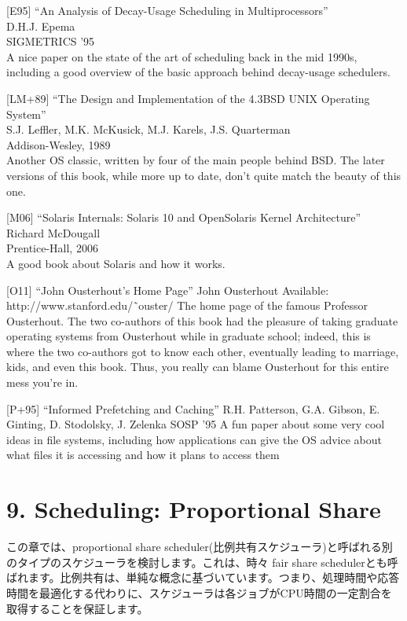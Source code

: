 {[}E95{]} ``An Analysis of Decay-Usage Scheduling in Multiprocessors''\\
D.H.J. Epema\\
SIGMETRICS '95\\
A nice paper on the state of the art of scheduling back in the mid
1990s, including a good overview of the basic approach behind
decay-usage schedulers.

{[}LM+89{]} ``The Design and Implementation of the 4.3BSD UNIX Operating
System''\\
S.J. Leffler, M.K. McKusick, M.J. Karels, J.S. Quarterman\\
Addison-Wesley, 1989\\
Another OS classic, written by four of the main people behind BSD. The
later versions of this book, while more up to date, don't quite match
the beauty of this one.

{[}M06{]} ``Solaris Internals: Solaris 10 and OpenSolaris Kernel
Architecture''\\
Richard McDougall\\
Prentice-Hall, 2006\\
A good book about Solaris and how it works.

{[}O11{]} ``John Ousterhout's Home Page'' John Ousterhout Available:
http://www.stanford.edu/˜ouster/ The home page of the famous Professor
Ousterhout. The two co-authors of this book had the pleasure of taking
graduate operating systems from Ousterhout while in graduate school;
indeed, this is where the two co-authors got to know each other,
eventually leading to marriage, kids, and even this book. Thus, you
really can blame Ousterhout for this entire mess you're in.

{[}P+95{]} ``Informed Prefetching and Caching'' R.H. Patterson, G.A.
Gibson, E. Ginting, D. Stodolsky, J. Zelenka SOSP '95 A fun paper about
some very cool ideas in file systems, including how applications can
give the OS advice about what files it is accessing and how it plans to
access them

\hypertarget{scheduling-proportional-share}{%
\section*{9. Scheduling: Proportional
Share}\label{scheduling-proportional-share}}

この章では、proportional share
scheduler(比例共有スケジューラ)と呼ばれる別のタイプのスケジューラを検討します。これは、時々
fair share
schedulerとも呼ばれます。比例共有は、単純な概念に基づいています。つまり、処理時間や応答時間を最適化する代わりに、スケジューラは各ジョブがCPU時間の一定割合を取得することを保証します。

